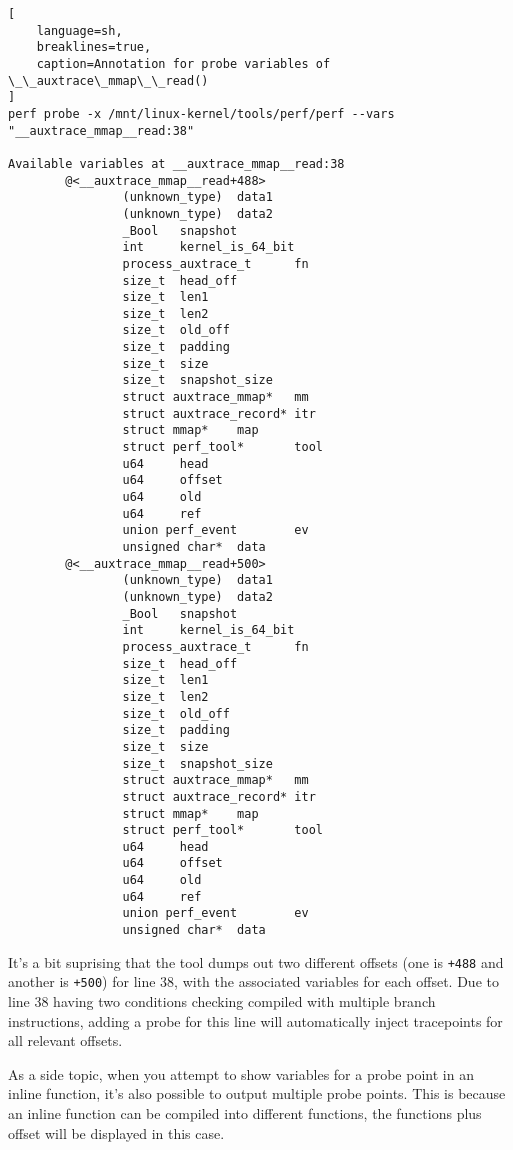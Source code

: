\documentclass[11pt]{diazessay} %
\def\code#1{\texttt{#1}}
\begin{document}
\begin{lstlisting}[
  	language=sh,
	breaklines=true,
	caption=Annotation for probe variables of \_\_auxtrace\_mmap\_\_read()
]
perf probe -x /mnt/linux-kernel/tools/perf/perf --vars "__auxtrace_mmap__read:38"

Available variables at __auxtrace_mmap__read:38
        @<__auxtrace_mmap__read+488>
                (unknown_type)  data1
                (unknown_type)  data2
                _Bool   snapshot
                int     kernel_is_64_bit
                process_auxtrace_t      fn
                size_t  head_off
                size_t  len1
                size_t  len2
                size_t  old_off
                size_t  padding
                size_t  size
                size_t  snapshot_size
                struct auxtrace_mmap*   mm
                struct auxtrace_record* itr
                struct mmap*    map
                struct perf_tool*       tool
                u64     head
                u64     offset
                u64     old
                u64     ref
                union perf_event        ev
                unsigned char*  data
        @<__auxtrace_mmap__read+500>
                (unknown_type)  data1
                (unknown_type)  data2
                _Bool   snapshot
                int     kernel_is_64_bit
                process_auxtrace_t      fn
                size_t  head_off
                size_t  len1
                size_t  len2
                size_t  old_off
                size_t  padding
                size_t  size
                size_t  snapshot_size
                struct auxtrace_mmap*   mm
                struct auxtrace_record* itr
                struct mmap*    map
                struct perf_tool*       tool
                u64     head
                u64     offset
                u64     old
                u64     ref
                union perf_event        ev
                unsigned char*  data
\end{lstlisting}

It's a bit suprising that the tool dumps out two different offsets (one is
\code{+488} and another is \code{+500}) for line 38, with the associated
variables for each offset. Due to line 38 having two conditions checking
compiled with multiple branch instructions, adding a probe for this line will
automatically inject tracepoints for all relevant offsets.

As a side topic, when you attempt to show variables for a probe point in an
inline function, it's also possible to output multiple probe points. This is
because an inline function can be compiled into different functions, the
functions plus offset will be displayed in this case.
\end{document}
